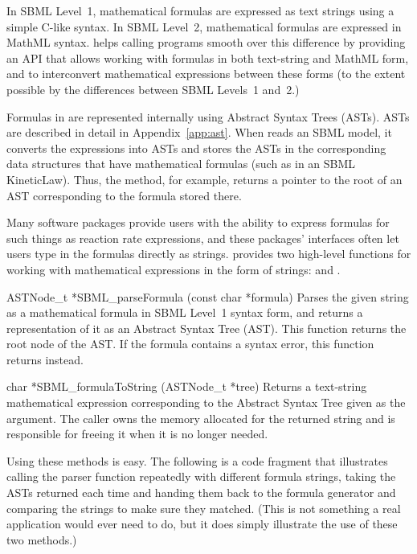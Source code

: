 \documentclass{sbmlmanual}
\begin{document}
In SBML Level~1, mathematical formulas are expressed as text strings using
a simple C-like syntax.  In SBML Level~2, mathematical formulas are
expressed in MathML syntax.  \libsbml{} helps calling programs smooth over
this difference by providing an API that allows working with formulas in
both text-string and MathML form, and to interconvert mathematical
expressions between these forms (to the extent possible by the differences
between SBML Levels~1 and~2.)

Formulas in \libsbml{} are represented internally using Abstract Syntax
Trees (ASTs).  ASTs are described in detail in Appendix~\ref{app:ast}.
When \libsbml{} reads an SBML model, it converts the expressions into ASTs
and stores the ASTs in the corresponding data structures that have
mathematical formulas (such as in an SBML KineticLaw).  Thus, the
 method, for example, returns a pointer to
the root of an AST corresponding to the formula stored there.

Many software packages provide users with the ability to express formulas
for such things as reaction rate expressions, and these packages'
interfaces often let users type in the formulas directly as strings.
\libsbml{} provides two high-level functions for working with mathematical
expressions in the form of strings:  and
.

\begin{methoddef}{ASTNode\_t *SBML\_parseFormula (const char *formula)}
  Parses the given string as a mathematical formula in SBML Level~1 syntax
  form, and returns a representation of it as an Abstract Syntax Tree
  (AST).  This function returns the root node of the AST.  If the formula
  contains a syntax error, this function returns  instead.
\end{methoddef}

\begin{methoddef}{char *SBML\_formulaToString (ASTNode\_t *tree)}
  Returns a text-string mathematical expression corresponding to the
  Abstract Syntax Tree given as the argument.  The caller owns the memory
  allocated for the returned string and is responsible for freeing it when
  it is no longer needed.
\end{methoddef}

Using these methods is easy.  The following is a code fragment that
illustrates calling the parser function repeatedly with different formula
strings, taking the ASTs returned each time and handing them back to the
formula generator and comparing the strings to make sure they matched.
(This is not something a real application would ever need to do, but it
does simply illustrate the use of these two methods.)
\end{document}
